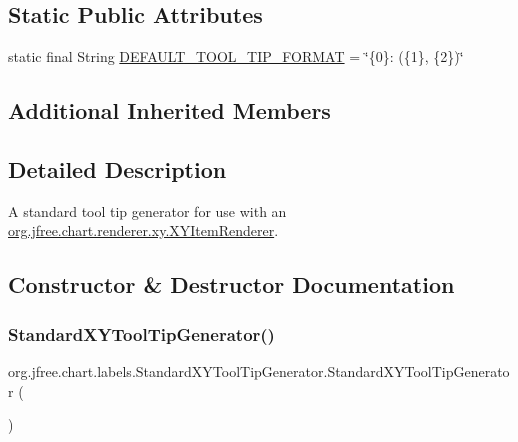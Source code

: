 \subsection*{Static Public Attributes}
\begin{DoxyCompactItemize}
\item 
static final String \mbox{\hyperlink{classorg_1_1jfree_1_1chart_1_1labels_1_1_standard_x_y_tool_tip_generator_a46c3281530f17b319b5a94e991b1389b}{D\+E\+F\+A\+U\+L\+T\+\_\+\+T\+O\+O\+L\+\_\+\+T\+I\+P\+\_\+\+F\+O\+R\+M\+AT}} = \char`\"{}\{0\}\+: (\{1\}, \{2\})\char`\"{}
\end{DoxyCompactItemize}
\subsection*{Additional Inherited Members}


\subsection{Detailed Description}
A standard tool tip generator for use with an \mbox{\hyperlink{interfaceorg_1_1jfree_1_1chart_1_1renderer_1_1xy_1_1_x_y_item_renderer}{org.\+jfree.\+chart.\+renderer.\+xy.\+X\+Y\+Item\+Renderer}}. 

\subsection{Constructor \& Destructor Documentation}
\mbox{\label{classorg_1_1jfree_1_1chart_1_1labels_1_1_standard_x_y_tool_tip_generator_a6ac1d9f935822678fe51942bcc6c6991}} 
\subsubsection{\texorpdfstring{Standard\+X\+Y\+Tool\+Tip\+Generator()}{StandardXYToolTipGenerator()}\hspace{0.1cm}{\footnotesize\ttfamily [1/5]}}
{\footnotesize\ttfamily org.\+jfree.\+chart.\+labels.\+Standard\+X\+Y\+Tool\+Tip\+Generator.\+Standard\+X\+Y\+Tool\+Tip\+Generator (\begin{DoxyParamCaption}{ }\end{DoxyParamCaption})}

